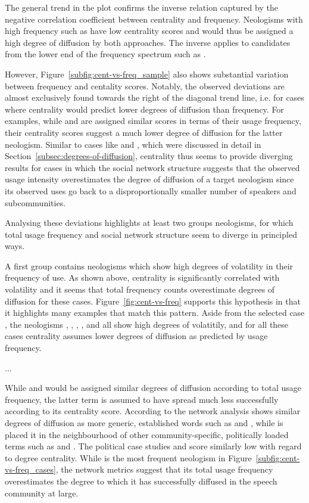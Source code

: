 \documentclass[
  a4paper,
  abstract=on,
  captions=tableabove
  ]{scrartcl}
\begin{document}
    The general trend in the plot confirms the inverse relation captured by the negative correlation coefficient between centrality and frequency. Neologisms with high frequency such as  have low centrality scores and would thus be assigned a high degree of diffusion by both approaches. The inverse applies to candidates from the lower end of the frequency spectrum such as .

    However, Figure~\ref{subfig:cent-vs-freq_sample} also shows substantial variation between frequency and centality scores. Notably, the observed deviations are almost exclusively found towards the right of the diagonal trend line, i.e. for cases where centrality would predict lower degrees of diffusion than frequency. For examples, while  and  are assigned similar scores in terms of their usage frequency, their centrality scores suggest a much lower degree of diffusion for the latter neologism. Similar to cases like  and , which were discussed in detail in Section~\ref{subsec:degrees-of-diffusion}, centrality thus seems to provide diverging results for cases in which the social network structure suggests that the observed usage intensity overestimates the degree of diffusion of a target neologism since its observed uses go back to a disproportionally smaller number of speakers and subcommunities.

    Analysing these deviations highlights at least two groups neologisms, for which total usage frequency and social network structure seem to diverge in principled ways.

    A first group contains neologisms which show high degrees of volatility in their frequency of use. As shown above, centrality is significantly correlated with volatility and it seems that total frequency counts overestimate degrees of diffusion for these cases. Figure~\ref{fig:cent-vs-freq} supports this hypothesis in that it highlights many examples that match this pattern. Aside from the selected case , the neologisms , , , , and  all show high degrees of volatitily, and for all these cases centrality assumes lower degrees of diffusion as predicted by usage frequency. 

    ...

    While  and  would be assigned similar degrees of diffusion according to total usage frequency, the latter term is assumed to have spread much less successfully according to its centrality score. According to the network analysis  shows similar degrees of diffusion as more generic, established words such as  and , while  is placed it in the neighbourhood of other community-specific, politically loaded terms such as  and . The political case studies  and  score similarly low with regard to degree centrality. While  is the most frequent neologism in Figure~\ref{subfig:cent-vs-freq_cases}, the network metrics suggest that its total usage frequency overestimates the degree to which it has successfully diffused in the speech community at large.
\end{document}
